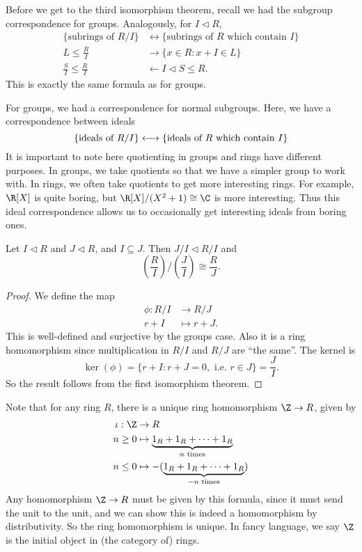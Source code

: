 \documentclass[a4paper]{article}
\begin{document}
Before we get to the third isomorphism theorem, recall we had the subgroup correspondence for groups. Analogously, for $I \lhd R$,
\begin{align*}
  \{\text{subrings of }R/I\} &\longleftrightarrow\{\text{subrings of }R\text{ which contain }I\}\\
  L \leq \frac{R}{I} &\longrightarrow \{x \in R: x + I \in L\}\\
  \frac{S}{I} \leq \frac{R}{I} &\longleftarrow I \lhd S \leq R.
\end{align*}
This is exactly the same formula as for groups.

For groups, we had a correspondence for normal subgroups. Here, we have a correspondence between ideals
\[
  \{\text{ideals of }R/I\} \longleftrightarrow\{\text{ideals of }R\text{ which contain }I\}\\
\]
It is important to note here quotienting in groups and rings have different purposes. In groups, we take quotients so that we have a simpler group to work with. In rings, we often take quotients to get more interesting rings. For example, $\R[X]$ is quite boring, but $\R[X]/(X^2 + 1) \cong \C$ is more interesting. Thus this ideal correspondence allows us to occasionally get interesting ideals from boring ones.

\begin{thm}
  Let $I \lhd R$ and $J \lhd R$, and $I \subseteq J$. Then $J / I \lhd R/I$ and
  \[
    \left(\frac{R}{I}\right) \big/ \left(\frac{J}{I}\right) \cong \frac{R}{J}.
  \]
\end{thm}

\begin{proof}
  We define the map
  \begin{align*}
    \phi: R/I &\to R/J\\
    r + I &\mapsto r + J.
  \end{align*}
  This is well-defined and surjective by the groups case. Also it is a ring homomorphism since multiplication in $R/I$ and $R/J$ are ``the same''. The kernel is
  \[
    \ker(\phi) = \{r + I: r + J = 0,\text{ i.e.\ } r \in J\} = \frac{J}{I}.
  \]
  So the result follows from the first isomorphism theorem.
\end{proof}

Note that for any ring $R$, there is a unique ring homomorphism $\Z \to R$, given by
\begin{align*}
  \iota: \Z &\to R\\
  n \geq 0 &\mapsto \underbrace{1_R + 1_R + \cdots + 1_R}_{n\text{ times}}\\
  n \leq 0 &\mapsto -(\underbrace{1_R + 1_R + \cdots + 1_R}_{-n\text{ times}})
\end{align*}
Any homomorphism $\Z \to R$ must be given by this formula, since it must send the unit to the unit, and we can show this is indeed a homomorphism by distributivity. So the ring homomorphism is unique. In fancy language, we say $\Z$ is the initial object in (the category of) rings.
\end{document}
